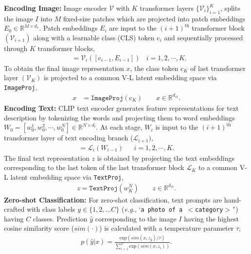 \documentclass[10pt,twocolumn,letterpaper]{article}
\def\eg{\emph{e.g.}\xspace}
\begin{document}
\noindent \textbf{Encoding Image:}
Image encoder $\mathcal{V}$ with $K$ transformer layers $\{\mathcal{V}_i\}_{i=1}^{K}$, splits the image $I$ into $M$ fixed-size patches which are projected into patch embeddings $E_0 \in \mathbb{R}^{M \times d_v}$.
Patch embeddings $E_i$ are input to the $(i+1)^{\text{th}}$ transformer block $(\mathcal{V}_{i+1})$ along with a learnable class (CLS) token $\text{c}_i$ and sequentially processed through $K$ transformer blocks,
\begin{align*}
[{\text{c}}_i, E_i] &= \mathcal{V}_{i}([\text{c}_{i-1}, E_{i-1}])  ~~~~ i= 1, 2, \cdots, K.
\end{align*}
To obtain the final image representation $x$, the class token $\text{c}_{K}$ of last transformer layer $(\mathcal{V}_{K})$ is projected to a common V-L latent embedding space via \texttt{ImageProj}, 
\begin{align*}
x &= \texttt{ImageProj}({\text{c}}_{K}) \ \ \ \ \ ~~~~ x \in \mathbb{R}^{d_{vl}}.
\end{align*}
\textbf{Encoding Text:} CLIP text encoder generates feature representations for text description by tokenizing the words and projecting them to  word embeddings 
${W}_0 =[w_{0}^{1}, w_{0}^{2}, \cdots, w_{0}^{N}] \in \mathbb{R}^{N \times d_{l}}$.
At each stage, ${W}_i$ is input to the $(i+1)^{\text{th}}$ transformer layer of text encoding branch ($\mathcal{L}_{i+1})$,
\begin{align*}
[{W}_i] = \mathcal{L}_{i}({W}_{i-1}) \ \ \ ~~~~ i= 1, 2, \cdots, K
. \end{align*}
The final text representation $z$ is obtained by projecting the text embeddings corresponding to the last token of the last transformer block $\mathcal{L}_K$ to a common V-L latent embedding space via \texttt{TextProj},
\begin{align*}
z = \texttt{TextProj}({w_{K}^{N}}) \ \ \ \ \ ~~~~ z \in \mathbb{R}^{d_{vl}}.
\end{align*} 
\textbf{Zero-shot Classification:}
For zero-shot classification, text prompts are hand-crafted with class labels $y\in \{1,2,\ldots C\}$ (\eg, ‘\texttt{a photo of a $<$category$>$’}) having $C$ classes. Prediction $\hat{y}$ corresponding to the image $I$ having the highest cosine similarity score ($sim(\cdot)$) is calculated with a temperature parameter $\tau$,
\begin{align*}
p(\hat{y}|x) = \frac{\text{exp}(sim(x, z_{\hat{y}})/\tau)}{\sum_{i=1}^{C}\text{exp}(sim(x, z_{i}))}.
\end{align*}
\end{document}
